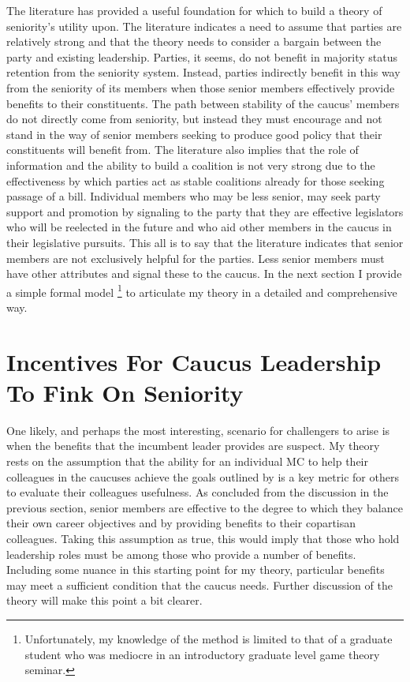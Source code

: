 \documentclass [12pt]{article}
\begin{document}
The literature has provided a useful foundation for which to build a theory of seniority's utility upon. The literature indicates a need to assume that parties are relatively strong and that the theory needs to consider a bargain between the party and existing leadership. Parties, it seems, do not benefit in majority status retention from the seniority system. Instead, parties indirectly benefit in this way from the seniority of its members when those senior members effectively provide benefits to their constituents. The path between stability of the caucus' members do not directly come from seniority, but instead they must encourage and not stand in the way of senior members seeking to produce good policy that their constituents will benefit from. The literature also implies that the role of information and the ability to build a coalition is not very strong due to the effectiveness by which parties act as stable coalitions already for those seeking passage of a bill. Individual members who may be less senior, may seek party support and promotion by signaling to the party that they are effective legislators who will be reelected in the future and who aid other members in the caucus in their legislative pursuits. This all is to say that the literature indicates that senior members are not exclusively helpful for the parties. Less senior members must have other attributes and signal these to the caucus. In the next section I provide a simple formal model \footnote{Unfortunately, my knowledge of the method is limited to that of a graduate student who was mediocre in an introductory graduate level game theory seminar.} to articulate my theory in a detailed and comprehensive way. 


\section*{Incentives For Caucus Leadership To Fink On Seniority}

One likely, and perhaps the most interesting, scenario for challengers to arise is when the benefits that the incumbent leader provides are suspect. My theory rests on the assumption that the ability for an individual MC to help their colleagues in the caucuses achieve the goals outlined by  is a key metric for others to evaluate their colleagues usefulness. As concluded from the discussion in the previous section, senior members are effective to the degree to which they balance their own career objectives and by providing benefits to their copartisan colleagues. Taking this assumption as true, this would imply that those who hold leadership roles must be among those who provide a number of benefits. Including some nuance in this starting point for my theory, particular benefits may meet a sufficient condition that the caucus needs. Further discussion of the theory will make this point a bit clearer.
  
\end{document}
